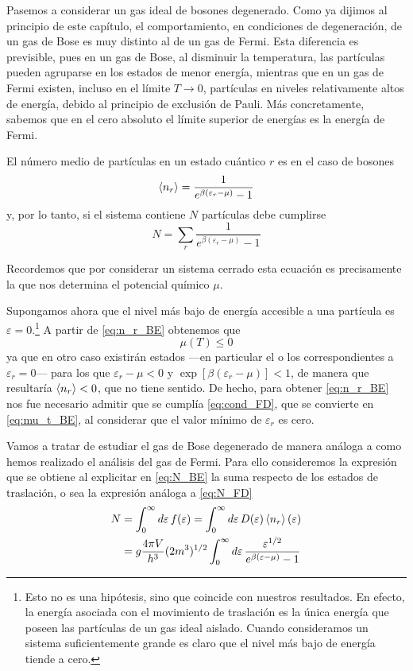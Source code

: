 Pasemos a considerar un gas ideal de bosones degenerado.
Como ya dijimos al principio de este capítulo, el comportamiento, en condiciones de degeneración, de un gas de Bose es muy distinto al de un gas de Fermi.
Esta diferencia es previsible, pues en un gas de Bose, al disminuir la temperatura, las partículas pueden agruparse en los estados de menor energía, mientras que en un gas de Fermi existen, incluso en el límite $T \rightarrow 0$, partículas en niveles relativamente altos de energía, debido al principio de exclusión de Pauli.
Más concretamente, sabemos que en el cero absoluto el límite superior de energías es la energía de Fermi.

El número medio de partículas en un estado cuántico $r$ es en el caso de bosones
\begin{equation}\label{eq:n_r_BE}
	\expval{n_r} = \frac{1}{e^{\beta(\varepsilon_r -\mu)} - 1}
\end{equation}
y, por lo tanto, si el sistema contiene $N$ partículas debe cumplirse
\begin{equation}\label{eq:N_BE}
	N = \sum_r \frac{1}{e^{\beta(\varepsilon_r -\mu)} - 1}
\end{equation}

Recordemos que por considerar un sistema cerrado esta ecuación es precisamente la que nos determina el potencial químico $\mu$.

Supongamos ahora que el nivel más bajo de energía accesible a una partícula es $\varepsilon = 0$.\footnote{Esto no es una hipótesis, sino que coincide con nuestros resultados. En efecto, la energía asociada con el movimiento de traslación es la única energía que poseen las partículas de un gas ideal aislado. Cuando consideramos un sistema suficientemente grande es claro que el nivel más bajo de energía tiende a cero.}
A partir de \eqref{eq:n_r_BE} obtenemos que
\begin{equation}\label{eq:mu_t_BE}
	\mu(T) \leq 0
\end{equation}
ya que en otro caso existirán estados ---en particular el o los correspondientes a $\varepsilon_r = 0$--- para los que $\varepsilon_r -\mu < 0$ y $\exp[\beta(\varepsilon_r -\mu)] < 1$, de manera que resultaría $\expval{n_r} < 0$, que no tiene sentido.
De hecho, para obtener \eqref{eq:n_r_BE} nos fue necesario admitir que se cumplía \eqref{eq:cond_FD}, que se convierte en \eqref{eq:mu_t_BE}, al considerar que el valor mínimo de $\varepsilon_r$ es cero.

Vamos a tratar de estudiar el gas de Bose degenerado de manera análoga a como hemos realizado el análisis del gas de Fermi.
Para ello consideremos la expresión que se obtiene al explicitar en \eqref{eq:N_BE} la suma respecto de los estados de traslación, o sea la expresión análoga a \eqref{eq:N_FD}
\begin{align}\label{eq:N_2_BE}
	N &= \int_0^{\infty} \dd{\varepsilon} f(\varepsilon) = \int_0^{\infty} \dd{\varepsilon} D(\varepsilon) \expval{n_r}(\varepsilon) \nonumber \\
	&= g \frac{4\pi V}{h^3} (2m^3)^{1/2} \int_0^{\infty} \dd{\varepsilon} \frac{\varepsilon^{1/2}}{e^{\beta(\varepsilon -\mu)} - 1}
\end{align}


